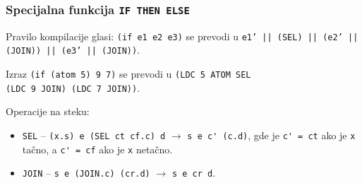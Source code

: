 \subsubsection{Specijalna funkcija {\tt IF THEN ELSE}}

Pravilo kompilacije glasi: \verb|(if e1 e2 e3)| se prevodi u
\texttt{e1' || (SEL) || (e2' || (JOIN)) || (e3' || (JOIN))}.

\begin{primer}
	Izraz \verb|(if (atom 5) 9 7)| se prevodi u \verb|(LDC 5 ATOM SEL|\\
	\verb|(LDC 9 JOIN) (LDC 7 JOIN))|.
\end{primer}

\newpage
Operacije na steku:
\begin{itemize}
	\item \verb|SEL| -- \verb|(x.s) e (SEL ct cf.c) d| $\rightarrow$ \verb|s e c' (c.d)|, gde je \verb|c' = ct| ako je \verb|x| tačno, a \verb|c' = cf| ako je \verb|x| netačno.
	
	\item \verb|JOIN| -- \verb|s e (JOIN.c) (cr.d)| $\rightarrow$ \verb|s e cr d|.\\
\end{itemize}



